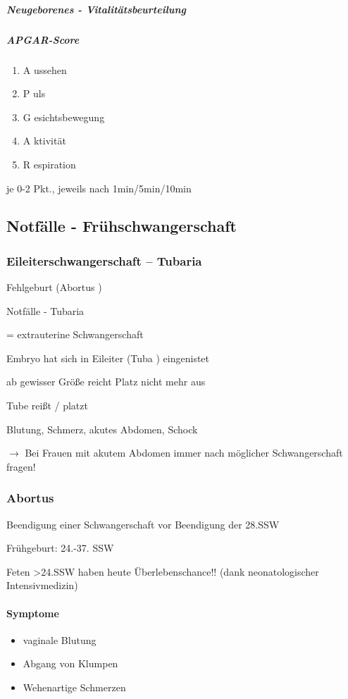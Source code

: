 \subparagraph{Neugeborenes - Vitalitätsbeurteilung}
\subparagraph*{APGAR-Score}

\begin{enumerate}
    \item A ussehen
    \item P uls
    \item G esichtsbewegung
    \item A ktivität
    \item R espiration
\end{enumerate}

je 0-2 Pkt., jeweils nach 1min/5min/10min

\subsection{Notfälle - Fr\"uhschwangerschaft}

\subsubsection{Eileiterschwangerschaft -- Tubaria}

Fehlgeburt (Abortus )

Notfälle - Tubaria

= extrauterine Schwangerschaft

Embryo hat sich in Eileiter (Tuba ) eingenistet

ab gewisser Grö{\ss}e reicht Platz nicht mehr aus

Tube rei{\ss}t / platzt


Blutung, Schmerz, akutes Abdomen, Schock

{\mdseries
${\rightarrow}$ Bei Frauen mit akutem Abdomen immer nach möglicher
Schwangerschaft fragen!}

\subsubsection{Abortus}
{\mdseries
Beendigung einer Schwangerschaft vor Beendigung der 28.SSW}

{\mdseries
Fr\"uhgeburt: 24.-37. SSW}

{\mdseries
Feten {\textgreater}24.SSW haben heute  \"Uberlebenschance!! (dank 
neonatologischer Intensivmedizin)}

\paragraph{Symptome}

\begin{itemize}
\item vaginale Blutung
\item Abgang von Klumpen
\item Wehenartige Schmerzen
\end{itemize}

